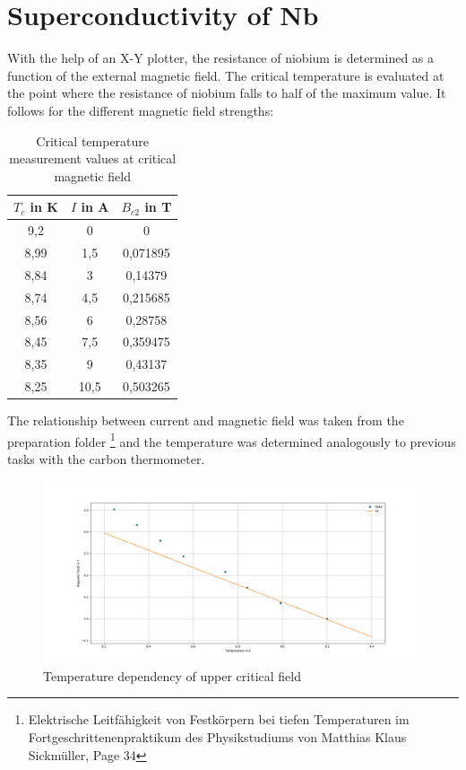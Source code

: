 

\section{Superconductivity of Nb}

With the help of an X-Y plotter, the resistance of niobium is determined as a function of the external magnetic field. The critical temperature is evaluated at the point where the resistance of niobium falls to half of the maximum value. It follows for the different magnetic field strengths:
\begin{table}
    \centering
    \caption{Critical temperature measurement values at critical magnetic field}
    \begin{tabular}{c|c|c}
        $ T_c$ in K&$I$ in A&$B_{c2}$ in T  \\
         \hline
         9,2& 0&0\\
         8,99&1,5&0,071895 \\
         8,84&3&0,14379 \\
         8,74&4,5&0,215685\\
         8,56&6&0,28758 \\
         8,45&7,5&0,359475 \\
         8,35&9&0,43137 \\
         8,25&10,5&0,503265 \\
    \end{tabular}
    \label{tab:Niob_critical}
\end{table}

The relationship between current and magnetic field was taken from the preparation folder
\footnote{Elektrische Leitfähigkeit von Festkörpern bei tiefen Temperaturen im Fortgeschrittenenpraktikum des Physikstudiums von Matthias Klaus Sickmüller, Page 34}
and the temperature was determined analogously to previous tasks with the carbon thermometer. 
\begin{figure}
    \centering
    \includegraphics[width=1.0\textwidth]{./fig/ex3.png}
    \caption{Temperature dependency of upper critical field}
    \label{fig:Nb_B_T}
\end{figure}

